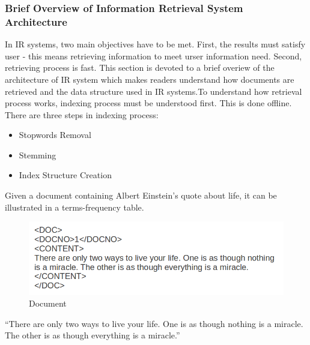\subsubsection{Brief Overview of Information Retrieval System Architecture}\label{section:IRarchitecture}
In IR systems, two main objectives have to be met. First, the results must satisfy user - this means retrieving information to meet urser
information need. Second, retrieving process is fast. This section is devoted to a brief overiew of the architecture of IR system which makes readers
understand how documents are retrieved and the data structure used in IR systems.To understand how retrieval process works, indexing process
must be understood first. This is done offline. There are three steps in indexing process:
\begin{itemize}
 \item Stopwords Removal
 \item Stemming
 \item Index Structure Creation
\end{itemize}
Given a document containing Albert Einstein's quote about life, it can be illustrated in a terms-frequency table.
\begin{figure}
\centering
\includegraphics[scale=0.5]{./figures/text.png}
\caption{Document} \label{fig:quote} 
\end{figure}

``There are only two ways to live your life. One is as though nothing is a miracle. The other is as though everything is a miracle.''

